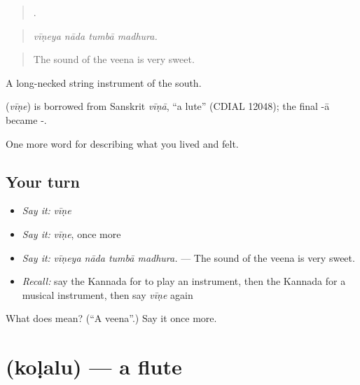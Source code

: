 \begin{quote}
   .
\end{quote}

\begin{quote}
\emph{vīṇeya nāda tumbā madhura.}
\end{quote}

\begin{quote}
The sound of the veena is very sweet.
\end{quote}

A long-necked string instrument of the south.

\begin{cousinweb}
\textbf{} (\emph{vīṇe}) is borrowed from Sanskrit \emph{vīṇā}, \textquotedblleft{}a lute\textquotedblright{} (CDIAL 12048); the final -ā became -.
\end{cousinweb}

\begin{grammarlens}[title={What you've built}]
One more word for describing what you lived and felt.
\end{grammarlens}

\subsection*{Your turn}
\begin{itemize}
\raggedright
  \item \emph{Say it:} \emph{vīṇe}
  \item \emph{Say it:} \emph{vīṇe}, once more
  \item \emph{Say it:} \emph{vīṇeya nāda tumbā madhura.} — The sound of the veena is very sweet.
  \item \emph{Recall:} say the Kannada for to play an instrument, then the Kannada for a musical instrument, then say \emph{vīṇe} again
\end{itemize}

\begin{tcolorbox}[breakable,colback=teal!4,colframe=teal!35!black,title={Before you move on}]
What does  mean? (\textquotedblleft{}A veena\textquotedblright{}.) Say it once more.
\end{tcolorbox}
\section[\texorpdfstring{\kn{ಕೊಳಲು} (koḷalu)}{ಕೊಳಲು (koḷalu)}]{ (koḷalu) — a flute}

